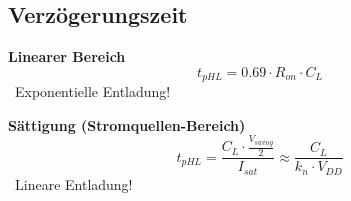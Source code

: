 \subsection{Verzögerungszeit}

\begin{minipage}[t]{0.48\columnwidth}
    \textbf{Linearer Bereich}
    $$ \boxed{t_{pHL} = 0.69 \cdot R_{on} \cdot C_L} $$
    \textrightarrow\ Exponentielle Entladung! 
\end{minipage}
\hfill
\begin{minipage}[t]{0.48\columnwidth}
    \textbf{Sättigung (Stromquellen-Bereich)}
    $$ \boxed{t_{pHL} = \frac{C_L \cdot \frac{V_{swing}}{2}}{I_{sat}} \approx \frac{C_L}{k_n \cdot V_{DD}} }$$
    \textrightarrow\ Lineare Entladung!
\end{minipage}


